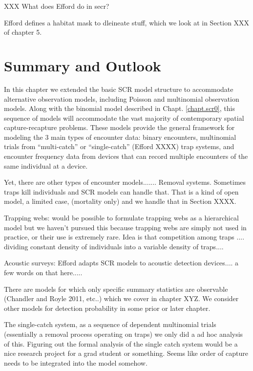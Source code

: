 XXX What does Efford do in secr?

Efford defines a habitat mask to dleineate stuff, which we look at in
Section XXX of chapter 5.


























\section{Summary and Outlook}

In this chapter we extended the basic SCR model structure to
accommodate alternative observation models, including Poisson and
multinomial observation models.
Along with the binomial model described in Chapt. \ref{chapt.scr0},
this sequence of models will accommodate the vast majority of
contemporary spatial capture-recapture problems. These models provide
the general framework for modeling the 3 main types of encounter data:
binary encounters, multinomial trials from ``multi-catch'' or
``single-catch'' (Efford XXXX) trap systems, and encounter frequency
data from devices that can record multiple encounters of the same
individual at a device. 
 
Yet, there are other types of encounter models.......
Removal systems. Sometimes traps kill individuals and SCR models can handle
that. That is a kind of open model, a limited case, (mortality only) and we handle that
in Section XXXX.

Trapping webs:
would be possible to formulate trapping webs as a hierarchical model
but we haven't pursued this because trapping webs are simply not used
in practice, or their use is extremely rare.  Idea is that competition
among traps .... dividing constant density of individuals into a
variable density of traps.... 

Acoustic surveys:
Efford adapts SCR models to acoustic detection devices.... a few words
on that here.....

There are models for which
only specific summary statistics are observable (Chandler and Royle
2011, etc..) which we cover in chapter XYZ.  We consider other models
for detection probability in some prior or later chapter. 

The single-catch system, as a sequence of dependent multinomial trials
(essentially a removal process operating on traps) we only did a ad
hoc analysis of this. 
Figuring out the formal analysis of the single catch system would be
a nice research project for a grad student or something. 
Seems like order of capture needs to be integrated into the model somehow.

